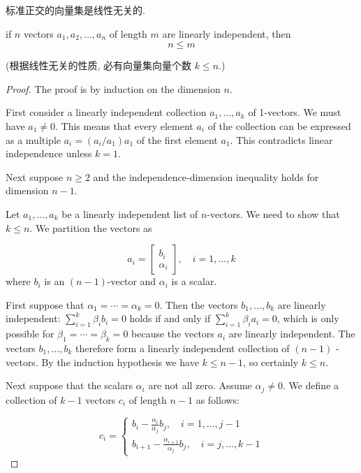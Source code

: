 \begin{corollary}
    标准正交的向量集是线性无关的. 
\end{corollary}

\begin{theorem}
    if $ n $ vectors $ a_{1}, a_{2}, \ldots, a_{n} $ of length $ m $ are linearly independent, then
$$
n \leq m
$$

    (根据线性无关的性质, 必有向量集向量个数 $ k \leq n $.)
\end{theorem}

\begin{proof}
    The proof is by induction on the dimension $n$.

    First consider a linearly independent collection $ a_{1}, \ldots, a_{k} $ of 1-vectors. We must have $ a_{1} \neq 0 $. This means that every element $ a_{i} $ of the collection can be expressed as a multiple $ a_{i}=\left(a_{i} / a_{1}\right) a_{1} $ of the first element $ a_{1} $. This contradicts linear independence unless $ k=1 $.

    Next suppose $ n \geq 2 $ and the independence-dimension inequality holds for dimension $ n-1 $. 
    
    Let $ a_{1}, \ldots, a_{k} $ be a linearly independent list of $ n $-vectors. We need to show that $ k \leq n $. We partition the vectors as

    $$
    a_{i}=\left[\begin{array}{r}
    b_{i} \\
    \alpha_{i}
    \end{array}\right], \quad i=1, \ldots, k
    $$
    where $ b_{i} $ is an $ (n-1) $-vector and $ \alpha_{i} $ is a scalar.

    First suppose that $ \alpha_{1}=\cdots=\alpha_{k}=0 $. Then the vectors $ b_{1}, \ldots, b_{k} $ are linearly independent: $ \sum_{i=1}^{k} \beta_{i} b_{i}=0 $ holds if and only if $ \sum_{i=1}^{k} \beta_{i} a_{i}=0 $, which is only possible for $ \beta_{1}=\cdots=\beta_{k}=0 $ because the vectors $ a_{i} $ are linearly independent. The vectors $ b_{1}, \ldots, b_{k} $ therefore form a linearly independent collection of $ (n-1) $ -vectors. By the induction hypothesis we have $ k \leq n-1 $, so certainly $ k \leq n $.

    Next suppose that the scalars $ \alpha_{i} $ are not all zero. Assume $ \alpha_{j} \neq 0 . $ We define a collection of $ k-1 $ vectors $ c_{i} $ of length $ n-1 $ as follows:

    $$c_{i}=\left\{\begin{matrix} 
        b_{i}-\frac{\alpha_{i}}{\alpha_{j}} b_{j}, \quad i=1, \ldots, j-1  \\  
       b_{i+1}-\frac{\alpha_{i+1}}{\alpha_{j}} b_{j}, \quad i=j, \ldots, k-1  
     \end{matrix}\right. $$


\end{proof}
